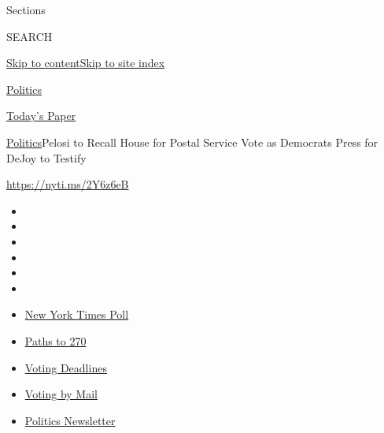 Sections

SEARCH

\protect\hyperlink{site-content}{Skip to
content}\protect\hyperlink{site-index}{Skip to site index}

\href{https://www.nytimes3xbfgragh.onion/section/politics}{Politics}

\href{https://myaccount.nytimes3xbfgragh.onion/auth/login?response_type=cookie\&client_id=vi}{}

\href{https://www.nytimes3xbfgragh.onion/section/todayspaper}{Today's
Paper}

\href{/section/politics}{Politics}\textbar{}Pelosi to Recall House for
Postal Service Vote as Democrats Press for DeJoy to Testify

\url{https://nyti.ms/2Y6z6eB}

\begin{itemize}
\item
\item
\item
\item
\item
\item
\end{itemize}

\begin{itemize}
\item
  \href{https://www.nytimes3xbfgragh.onion/2020/09/12/us/politics/biden-trump-poll-wisconsin-minnesota.html?action=click\&pgtype=Article\&state=default\&region=TOP_BANNER\&context=storylines_menu}{New
  York Times Poll}
\item
  \href{https://www.nytimes3xbfgragh.onion/interactive/2020/us/elections/election-states-biden-trump.html?action=click\&pgtype=Article\&state=default\&region=TOP_BANNER\&context=storylines_menu}{Paths
  to 270}
\item
  \href{https://www.nytimes3xbfgragh.onion/interactive/2019/us/elections/2020-presidential-election-calendar.html?action=click\&pgtype=Article\&state=default\&region=TOP_BANNER\&context=storylines_menu}{Voting
  Deadlines}
\item
  \href{https://www.nytimes3xbfgragh.onion/interactive/2020/08/31/us/politics/vote-by-mail-deadlines.html?action=click\&pgtype=Article\&state=default\&region=TOP_BANNER\&context=storylines_menu}{Voting
  by Mail}
\item
  \href{https://www.nytimes3xbfgragh.onion/newsletters/politics?action=click\&pgtype=Article\&state=default\&region=TOP_BANNER\&context=storylines_menu}{Politics
  Newsletter}
\end{itemize}

